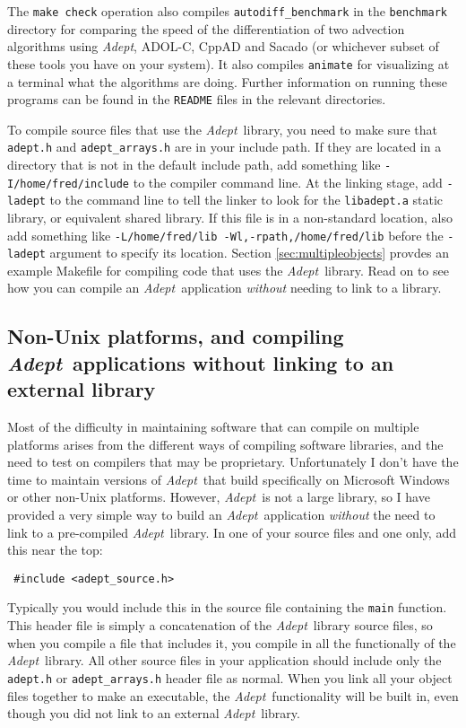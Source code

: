 \documentclass[a4,oneside]{book}
\def\codesize{\small}
\def\Adept{\emph{Adept}}
\def\code#1{{\codesize\texttt{#1}}}
\begin{document}
\begin{enumerate}
The \code{make check} operation also compiles
\code{autodiff\_benchmark} in the \code{benchmark} directory for
comparing the speed of the differentiation of two advection algorithms
using \Adept, ADOL-C, CppAD and Sacado (or whichever subset of these
tools you have on your system).  It also compiles \code{animate} for
visualizing at a terminal what the algorithms are doing.  Further
information on running these programs can be found in the
\code{README} files in the relevant directories.
\end{enumerate}

To compile source files that use the \Adept\ library, you need to make
sure that \code{adept.h} and \code{adept\_arrays.h} are in your
include path. If they are located in a directory that is not in the
default include path, add something like \code{-I/home/fred/include}
to the compiler command line. At the linking stage, add \code{-ladept}
to the command line to tell the linker to look for the
\code{libadept.a} static library, or equivalent shared library. If
this file is in a non-standard location, also add something like
\code{-L/home/fred/lib -Wl,-rpath,/home/fred/lib} before the
\code{-ladept} argument to specify its location. Section
\ref{sec:multipleobjects} provdes an example Makefile for compiling
code that uses the \Adept\ library. Read on to see how you can compile
an \Adept\ application \emph{without} needing to link to a library.

\subsection{Non-Unix platforms, and compiling \Adept\ applications
  without linking to an external library}
\label{sec:non-unix}

Most of the difficulty in maintaining software that can compile on
multiple platforms arises from the different ways of compiling
software libraries, and the need to test on compilers that may be
proprietary.  Unfortunately I don't have the time to maintain versions
of \Adept\ that build specifically on Microsoft Windows or other
non-Unix platforms.  However, \Adept\ is not a large library, so I
have provided a very simple way to build an \Adept\ application
\emph{without} the need to link to a pre-compiled \Adept\ library. In
one of your source files and one only, add this near the top:
\begin{lstlisting}
 #include <adept_source.h>
\end{lstlisting}
Typically you would include this in the source file containing the
\code{main} function.  This header file is simply a concatenation of
the \Adept\ library source files, so when you compile a file that
includes it, you compile in all the functionally of the
\Adept\ library. All other source files in your application should
include only the \code{adept.h} or \code{adept\_arrays.h} header file
as normal.  When you link all your object files together to make an
executable, the \Adept\ functionality will be built in, even though
you did not link to an external \Adept\ library.
\end{document}
